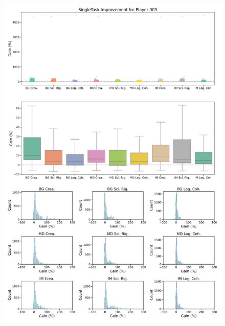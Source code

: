 \begin{figure}[ht]
  \centering
  \includegraphics[width=\textwidth]{figures/gain_validity/singletask/singletask_gain_player_00003.pdf}
\end{figure}
\clearpage

